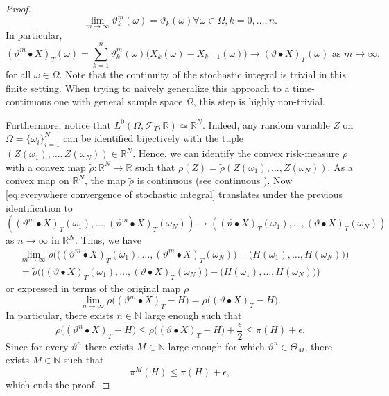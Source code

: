 \documentclass[11pt,a4paper,twoside,openany]{report}
\numberwithin{equation}{section}
\theoremstyle{plain} %
\theoremstyle{definition} %
\theoremstyle{remark} %
\let\parencite\authnumparencite
\begin{document}
\begin{proof}
 \begin{equation*}
     \lim_{m\to\infty}\vartheta_k^m(\omega)=\vartheta_k(\omega)\forall\omega\in\Omega,k=0,\dots,n.
 \end{equation*}
 In particular, 
 \begin{equation}\label{eq:everywhere convergence of stochastic integral}
(\vartheta^m\bullet X)_T(\omega)=\sum_{k=1}^{n}\vartheta^m_k(\omega)\big(X_{k}(\omega)-X_{k-1}(\omega)\big)\to(\vartheta\bullet X)_T(\omega)\text{ as }m\to\infty.
\end{equation}
 for all \(\omega\in\Omega\).
Note that the continuity of the stochastic integral is trivial in this finite setting. When trying to naively generalize this approach to a time-continuous one with general sample space \(\Omega\), this step is highly non-trivial.


 Furthermore, notice that \( L^0(\Omega,\mathcal{F}_T;\mathbb{R})\simeq\mathbb{R}^{N}\). Indeed, any random variable \(Z\) on \(\Omega=\{\omega_i\}_{i=1}^N\) can be identified bijectively with the tuple \((Z(\omega_1),\dots,Z(\omega_N))\in\mathbb{R}^N\). Hence, we can identify the convex risk-measure \(\rho\) with a convex map \(\tilde{\rho}:\mathbb{R}^{N}\to\mathbb{R}\) such that \(\rho(Z)=\widetilde{\rho}(Z(\omega_1),\dots,Z(\omega_N))\). As a convex map on \(\mathbb{R}^N\), the map \(\widetilde{\rho}\) is continuous (see continuous \parencite[Thm.~10.1]{Rockafellar1970ConvexAnalysis}). Now \eqref{eq:everywhere convergence of stochastic integral} translates under the previous identification to \(((\vartheta^m\bullet X)_T(\omega_1),\dots, (\vartheta^m\bullet X)_T(\omega_N))\to((\vartheta\bullet X)_T(\omega_1),\dots, (\vartheta\bullet X)_T(\omega_N))\) as \(n\to\infty\) in \(\mathbb{R}^N\).
 Thus, we have
  \begin{align*}
     &\lim_{m\to\infty}\widetilde{\rho}\Big(\big((\vartheta^m\bullet X)_T(\omega_1),\dots, (\vartheta^m\bullet X)_T(\omega_N)\big)-(H(\omega_1),\dots,H(\omega_N)\big)\Big)
     \\&=\widetilde{\rho}\Big(\big((\vartheta\bullet X)_T(\omega_1),\dots, (\vartheta\bullet X)_T(\omega_N)\big)-(H(\omega_1),\dots,H(\omega_N)\big)\Big)
\end{align*}
 or expressed in terms of the original map \(\rho\)
 \begin{equation*}
     \lim_{n\to\infty}\rho\big((\vartheta^m\bullet X)_T-H\big)=\rho\big((\vartheta\bullet X)_T-H\big).
\end{equation*}
In particular, there exists \(n\in\mathbb{N}\) large enough such that 
\begin{equation*}
    \rho\big((\vartheta^n\bullet X)_T-H\big)\leq\rho\big((\vartheta\bullet X)_T-H\big)+\frac{\epsilon}{2}\leq\pi(H)+\epsilon.
\end{equation*}
Since for every \(\vartheta^n\) there exists \(M\in\mathbb{N}\) large enough for which \(\vartheta^n\in\Theta_M\), there exists \(M\in\mathbb{N}\) such that 
\begin{equation*}
    \pi^M(H)\leq\pi(H)+\epsilon,
\end{equation*}
which ends the proof.
\end{proof}
\end{document}

